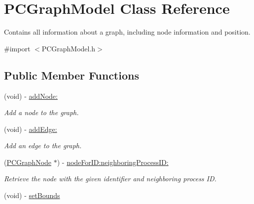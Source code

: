 \hypertarget{interface_p_c_graph_model}{
\section{PCGraphModel Class Reference}
\label{interface_p_c_graph_model}
}


Contains all information about a graph, including node information and position.  




{\ttfamily \#import $<$PCGraphModel.h$>$}

\subsection*{Public Member Functions}
\begin{DoxyCompactItemize}
\item 
\hypertarget{interface_p_c_graph_model_a6d3375b10362e838b2cfd276c860fc54}{
(void) -\/ \hyperlink{interface_p_c_graph_model_a6d3375b10362e838b2cfd276c860fc54}{addNode:}}
\label{interface_p_c_graph_model_a6d3375b10362e838b2cfd276c860fc54}

\begin{DoxyCompactList}\small\item\em Add a node to the graph. \end{DoxyCompactList}\item 
\hypertarget{interface_p_c_graph_model_ab224de9125f85bc52fe761d2e0622c6b}{
(void) -\/ \hyperlink{interface_p_c_graph_model_ab224de9125f85bc52fe761d2e0622c6b}{addEdge:}}
\label{interface_p_c_graph_model_ab224de9125f85bc52fe761d2e0622c6b}

\begin{DoxyCompactList}\small\item\em Add an edge to the graph. \end{DoxyCompactList}\item 
\hypertarget{interface_p_c_graph_model_a351485af7d493e481c47a24b0bcecfdb}{
(\hyperlink{interface_p_c_graph_node}{PCGraphNode} $\ast$) -\/ \hyperlink{interface_p_c_graph_model_a351485af7d493e481c47a24b0bcecfdb}{nodeForID:neighboringProcessID:}}
\label{interface_p_c_graph_model_a351485af7d493e481c47a24b0bcecfdb}

\begin{DoxyCompactList}\small\item\em Retrieve the node with the given identifier and neighboring process ID. \end{DoxyCompactList}\item 
\hypertarget{interface_p_c_graph_model_af5460fb1fbd90b7a2c515ec64c7ec61b}{
(void) -\/ \hyperlink{interface_p_c_graph_model_af5460fb1fbd90b7a2c515ec64c7ec61b}{setBounds}}
\label{interface_p_c_graph_model_af5460fb1fbd90b7a2c515ec64c7ec61b}


\end{DoxyCompactItemize}
